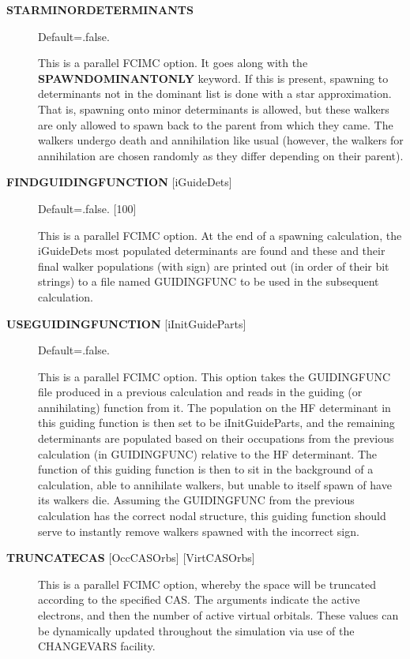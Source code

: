 \documentclass[openany,a4paper,10pt,english]{manual}
\begin{document}
\begin{description}
\item[\textbf{STARMINORDETERMINANTS}] \leavevmode
Default=.false.

This is a parallel FCIMC option.  It goes along with the \textbf{SPAWNDOMINANTONLY} keyword.  If this
is present, spawning to determinants not in the dominant list is done with a star approximation.
That is, spawning onto minor determinants is allowed, but these walkers are only allowed
to spawn back to the parent from which they came.  The walkers undergo death and annihilation
like usual (however, the walkers for annihilation are chosen randomly as they differ depending
on their parent).

\item[\textbf{FINDGUIDINGFUNCTION} {[}iGuideDets{]}] \leavevmode
Default=.false. {[}100{]}

This is a parallel FCIMC option.  At the end of a spawning calculation, the iGuideDets most populated
determinants are found and these and their final walker populations (with sign) are printed out
(in order of their bit strings) to a file named GUIDINGFUNC to be used in the subsequent calculation.

\item[\textbf{USEGUIDINGFUNCTION} {[}iInitGuideParts{]}] \leavevmode
Default=.false.

This is a parallel FCIMC option.  This option takes the GUIDINGFUNC file produced in a previous calculation
and reads in the guiding (or annihilating) function from it.  The population on the HF determinant in this
guiding function is then set to be iInitGuideParts, and the remaining determinants are populated based on
their occupations from the previous calculation (in GUIDINGFUNC) relative to the HF determinant.
The function of this guiding function is then to sit in the background of a calculation, able to annihilate
walkers, but unable to itself spawn of have its walkers die.
Assuming the GUIDINGFUNC from the previous calculation has the correct nodal structure, this guiding function
should serve to instantly remove walkers spawned with the incorrect sign.

\item[\textbf{TRUNCATECAS} {[}OccCASOrbs{]} {[}VirtCASOrbs{]}] \leavevmode
This is a parallel FCIMC option, whereby the space will be truncated according to the specified CAS.
The arguments indicate the active electrons, and then the number of active virtual orbitals.
These values can be dynamically updated throughout the simulation via use of the CHANGEVARS facility.


\end{description}
\end{document}
